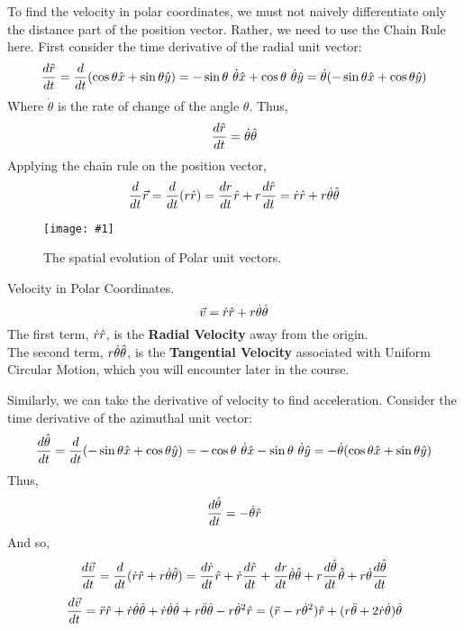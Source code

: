 \documentclass[11pt]{article}
\newcommand{\fig}[4]{
    \begin{figure}[H]
        \centering
        \texttt{[image: \#1]}
        \caption{#2}
        \label{exp4fit}
    \end{figure}
}
\theoremstyle{gangnamstyle}{\newtheorem{definition}{Definition}[]}
\theoremstyle{gangnamstyle}{\newtheorem{example}{Example}[]}
\theoremstyle{gangnamstyle}{\newtheorem{problem}{Problem}[]}
\begin{document}
To find the velocity in polar coordinates, we must not naively differentiate only the distance part of the position vector. Rather, we need to use the Chain Rule here. First consider the time derivative of the radial unit vector: 
\[ \frac{d\Hat{r}}{dt} = \frac{d}{dt}(\cos\theta\Hat{x} + \sin\theta\Hat{y}) = -\sin\theta \ \Dot{\theta} \Hat{x} + \cos\theta \ \Dot{\theta} \Hat{y} = \Dot{\theta}(-\sin\theta\Hat{x} + \cos\theta\Hat{y}) \]
Where $\Dot{\theta}$ is the rate of change of the angle $\theta$. Thus, 
\[ \frac{d\Hat{r}}{dt} = \Dot{\theta}\Hat{\theta} \]
Applying the chain rule on the position vector, 
\[ \frac{d}{dt} \Vec{r} = \frac{d}{dt} (r\Hat{r}) = \frac{dr}{dt}\Hat{r} + r\frac{d\Hat{r}}{dt} = \Dot{r}\Hat{r} + r\Dot{\theta}\Hat{\theta} \]

\fig{figs/n0/change.jpg}{The spatial evolution of Polar unit vectors.}{0.1}{0}

\begin{definition}
Velocity in Polar Coordinates. \\
\begin{equation}
\Vec{v} = \Dot{r}\Hat{r} + r\Dot{\theta}\Hat{\theta}
\end{equation}
The first term, $\Dot{r}\Hat{r}$, is the \textbf{Radial Velocity} away from the origin. \\ 
The second term, $r\Dot{\theta}\Hat{\theta}$, is the \textbf{Tangential Velocity} associated with Uniform Circular Motion, which you will encounter later in the course. 
\end{definition}

Similarly, we can take the derivative of velocity to find acceleration. Consider the time derivative of the azimuthal unit vector: 
\[ \frac{d\Hat{\theta}}{dt} = \frac{d}{dt}(-\sin\theta\Hat{x} + \cos\theta\Hat{y}) = -\cos\theta \ \Dot{\theta}\Hat{x} - \sin\theta \ \Dot{\theta}\Hat{y} = -\Dot{\theta}(\cos\theta\Hat{x} + \sin\theta\Hat{y}) \]
Thus, 
\[ \frac{d\Hat{\theta}}{dt} = -\Dot{\theta}\Hat{r} \]
And so, 
\[ \frac{d\Vec{v}}{dt} = \frac{d}{dt}(\Dot{r}\Hat{r} + r\Dot{\theta}\Hat{\theta}) = \frac{d\Dot{r}}{dt}\Hat{r} + \Dot{r}\frac{d\Hat{r}}{dt} + \frac{dr}{dt}\Dot{\theta}\Hat{\theta} + r\frac{d\Dot{\theta}}{dt}\Hat{\theta} + r\Dot{\theta}\frac{d\Hat{\theta}}{dt} \]
\[ \frac{d\Vec{v}}{dt} = \Ddot{r}\Hat{r} + \Dot{r}\Dot{\theta}\Hat{\theta} + \Dot{r}\Dot{\theta}\Hat{\theta} + r\Ddot{\theta}\Hat{\theta} -r\Dot{\theta}^2\Hat{r} = (\Ddot{r} - r\Dot{\theta}^2)\Hat{r} + (r\Ddot{\theta} + 2\Dot{r}\Dot{\theta})\Hat{\theta} \]
\end{document}

